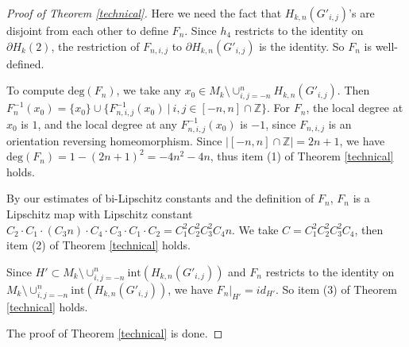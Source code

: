 \documentclass{amsart}
\begin{document}
\begin{proof}[Proof of Theorem \ref{technical}]
Here we need the fact that $H_{k,n}(G'_{i,j})$'s are disjoint from each other to define $F_n$. Since $h_4$ restricts to the identity on $\partial H_k(2)$, the restriction of $F_{n,i,j}$ to $\partial H_{k,n}(G'_{i,j})$ is the identity. So $F_n$ is well-defined.

To compute $\text{deg}(F_n)$, we take any $x_0\in M_k \setminus \cup_{i,j=-n}^nH_{k,n}(G'_{i,j})$. Then $F_n^{-1}(x_0)=\{x_0\}\cup \{F_{n,i,j}^{-1}(x_0)\ |\ i,j\in [-n,n]\cap \mathbb{Z}\}$. For $F_n$, the local degree at $x_0$ is $1$, and the local degree at any $F_{n,i,j}^{-1}(x_0)$ is $-1$, since $F_{n,i,j}$ is an orientation reversing homeomorphism. Since $|[-n,n]\cap \mathbb{Z}|=2n+1$, we have $\text{deg}(F_n)=1-(2n+1)^2=-4n^2-4n$, thus item (1) of Theorem \ref{technical} holds.

By our estimates of bi-Lipschitz constants and the definition of $F_n$, $F_n$ is a Lipschitz map with Lipschitz constant $C_2\cdot C_1\cdot (C_3n)\cdot C_4\cdot C_3 \cdot C_1\cdot C_2=C_1^2C_2^2C_3^2C_4n$. We take $C=C_1^2C_2^2C_3^2C_4$, then item (2) of Theorem \ref{technical} holds.

Since $H'\subset M_k\setminus \cup_{i,j=-n}^n\text{int}(H_{k,n}(G'_{i,j}))$ and $F_n$ restricts to the identity on $M_k\setminus \cup_{i,j=-n}^n\text{int}(H_{k,n}(G'_{i,j}))$, we have $F_n|_{H'}=id_{H'}$. So item (3) of Theorem \ref{technical} holds. 

The proof of Theorem \ref{technical} is done.

\end{proof}







\end{document}
